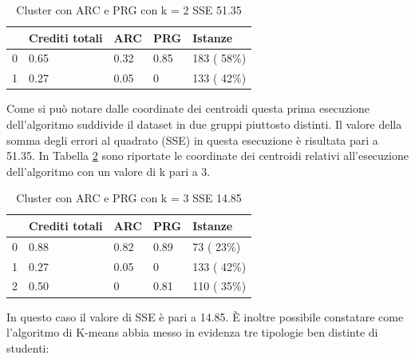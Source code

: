 \documentclass[12pt]{article}
\begin{document}
\begin{table}[ht]
	\centering
	\begin{tabular}{@{}lllll@{}}
	\toprule
	  & Crediti totali & ARC  & PRG  & Istanze\\ \midrule
	0 & 0.65           & 0.32 & 0.85 & 183 ( 58\%)\\
	1 & 0.27           & 0.05 & 0    & 133 ( 42\%)\\ \bottomrule
	\end{tabular}
	\caption{Cluster con ARC e PRG con k = 2 SSE 51.35}
	\label{c2AP}
\end{table}
Come si può notare dalle coordinate dei centroidi questa prima esecuzione dell'algoritmo suddivide il dataset in due gruppi piuttosto distinti.
Il valore della somma degli errori al quadrato (SSE) in questa esecuzione è risultata pari a 51.35.
In Tabella \ref{c3AP} sono riportate le coordinate dei centroidi relativi all'esecuzione dell'algoritmo con un valore di k pari a 3.
\begin{table}[ht]
	\centering
	\begin{tabular}{@{}lllll@{}}
	\toprule
	  & Crediti totali & ARC  & PRG  & Istanze\\ \midrule
	0 & 0.88           & 0.82 & 0.89 & 73 ( 23\%)\\
	1 & 0.27           & 0.05 & 0    & 133 ( 42\%)\\
	2 & 0.50           & 0    & 0.81 & 110 ( 35\%)\\ \bottomrule
	\end{tabular}
	\caption{Cluster con ARC e PRG con k = 3 SSE 14.85}
	\label{c3AP}
\end{table}
In questo caso il valore di SSE è pari a 14.85. È inoltre possibile constatare come l'algoritmo di K-means abbia messo in evidenza tre tipologie ben distinte di studenti:
\end{document}
